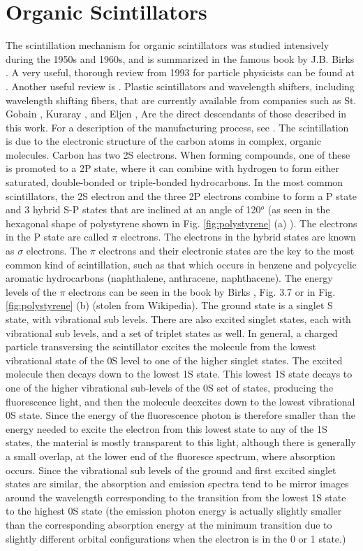\section{Organic Scintillators}
The scintillation mechanism for organic scintillators
was studied intensively during
the 1950s and 1960s, and is summarized in the famous book by
J.B. Birks \cite{birks}. 
A very useful, thorough review from 1993 for particle physicists can be found at \cite{sauli}.  Another useful review is \cite{Bross1990315}.
Plastic scintillators and wavelength shifters, including
wavelength shifting fibers, that are currently available
from companies such as St. Gobain \cite{stgobain}, Kuraray \cite{kuraray}, and 
Eljen \cite{eljen}, Are the direct descendants of those
described in this work.  For a description of the manufacturing process, see \cite{sauli}.
The scintillation is due to the
electronic structure of the carbon atoms in complex, organic molecules.  
Carbon
has two 2S electrons.  When forming compounds, one of these is promoted
to a 2P state, where it can combine with hydrogen to
form either saturated, double-bonded or triple-bonded hydrocarbons.  
In the most common scintillators,
the 2S electron and the three 2P electrons combine to form a P state and 
3 hybrid S-P states that are inclined
at an angle of 120$^o$ (as seen in the hexagonal shape of
polystyrene shown in Fig. \ref{fig:polystyrene} (a) ).  
The electrons in the P state are called $\pi$ electrons.
The electrons in the hybrid states are
known as $\sigma$ electrons.
The $\pi$ electrons and their electronic states
are the key to the most common
kind of scintillation, such as that which occurs 
in benzene and polycyclic aromatic hydrocarbons (naphthalene, 
anthracene, naphthacene).  The energy levels of the $\pi$
electrons can be seen in the book by Birks \cite{birks}, Fig. 3.7
or in Fig. \ref{fig:polystyrene} (b) (stolen from Wikipedia).  The
ground state is a singlet S state, with vibrational sub levels. 
There are also excited singlet states, each with vibrational sub levels,
and a set of triplet states as well.  In general, a charged
particle transversing the scintillator
excites the molecule from the lowest vibrational state of the
0S level
to one of the higher singlet states.  The excited molecule
then decays down to the lowest 1S state.  This lowest 1S state decays to
one of the higher vibrational sub-levels of the 0S set of states,
producing the fluorescence light, and then the molecule
deexcites down to the lowest vibrational 0S state.  Since the energy of
the fluorescence photon is therefore smaller than the energy needed to
excite the electron from this lowest state to any of the 1S states,
the material is mostly transparent to this light, although
there is generally a small overlap, at the lower end of the 
fluoresce spectrum, where absorption occurs.  Since the
vibrational sub levels of the ground and first excited singlet 
states are similar, the absorption and emission spectra tend to
be mirror images around the wavelength corresponding to the transition
from the lowest 1S state to the highest 0S state (the
emission photon energy is actually slightly smaller than
the corresponding absorption energy at the minimum 
transition due to slightly different orbital configurations
when the electron is in the 0 or 1 state\cite{brown}.)

